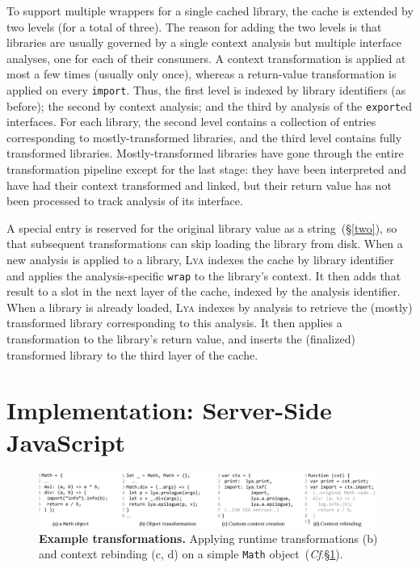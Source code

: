 \documentclass[letterpaper,twocolumn,10pt]{article}
\newcommand{\ttt}[1]{\texttt{#1}}
\newcommand{\cf}[1]{(\emph{Cf}.\S\ref{#1})}
\newcommand{\sx}[1]{(\S\ref{#1})}
\newcommand{\sys}{{\scshape Lya}\xspace}
\begin{document}
To support multiple wrappers for a single cached library, the cache is extended by two levels (for a total of three).
The reason for adding the two levels is that libraries are usually governed by a single context analysis but multiple interface analyses, one for each of their consumers.
A context transformation is applied at most a few times (usually only once), whereas a return-value transformation is applied on every \ttt{import}.
Thus, the first level is indexed by library identifiers (as before); the second by context analysis; and the third by analysis of the \ttt{export}ed interfaces.
For each library, the second level contains a collection of entries corresponding to mostly-transformed libraries, and the third level contains fully transformed libraries.
Mostly-transformed libraries have gone through the entire transformation pipeline except for the last stage:
  they have been interpreted and have had their context transformed and linked, but their return value has not been processed to track analysis of its interface.

A special entry is reserved for the original library value as a string~\sx{two}, so that subsequent transformations can skip loading the library from disk.
When a new analysis is applied to a library, \sys indexes the cache by library identifier and applies the analysis-specific \ttt{wrap} to the library's context.
It then adds that result to a slot in the next layer of the cache, indexed by the analysis identifier.
When a library is already loaded, \sys indexes by analysis to retrieve the (mostly) transformed library corresponding to this analysis.
It then applies a transformation to the library's return value, and inserts the (finalized) transformed library to the third layer of the cache.


\section{Implementation: Server-Side JavaScript}
\label{impl}

\begin{figure}[t]
\centering
\includegraphics[width=0.99\textwidth]{./figs/lya_ex2.pdf}
\vspace{-2mm}
\caption{
  \textbf{Example transformations.}
   Applying runtime transformations (b) and context rebinding (c, d) on a simple \ttt{Math} object~\cf{impl}.
}
\label{fig:ex2}
\vspace{-4mm}
\end{figure}
\end{document}
